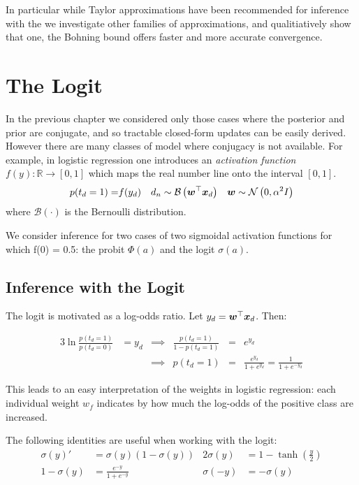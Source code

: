 In particular while Taylor approximations have been recommended for inference with the \cite{Wang2013} we investigate other families of approximations, and qualitiatively show that one, the Bohning bound\cite{Bohning1988} offers faster and more accurate convergence. 
\section{The Logit}
In the previous chapter we considered only those cases where the posterior and prior are conjugate, and so tractable closed-form updates can be easily derived. However there are many classes of model where conjugacy is not available. For example, in logistic regression one introduces an \emph{activation function} $f(y) : \mathbb{R} \rightarrow [0, 1]$ which maps the real number line onto the interval $[0,1]$.
\begin{align*}
p(t_d = 1) = & f(y_d) & d_n  & \sim \mathcal{B} \left( \bm w^\top\bm x_d\right) & \bm w & \sim \mathcal{N} \left( {0}, {\alpha^2 I} \right) \\
\end{align*}
where $\mathcal{B}(\cdot)$ is the Bernoulli distribution.

We consider inference for two cases of two sigmoidal activation functions for which f(0) = 0.5: the probit $\Phi(a)$ and the logit $\sigma(a)$.

\subsection{Inference with the Logit}
The logit is motivated as a log-odds ratio. Let $y_d = \bm w^\top\bm x_d$. Then:

\begin{alignat}{3}
\ln \frac{p(t_d = 1)}{p(t_d = 0)}  & = y_d  &
\implies & \frac{p(t_d = 1)}{1 - p(t_d = 1)}  & = & e^{y_d} \\
& & \implies &  p(t_d = 1)                    & = & \frac{e^{y_d}}{1 + e^{y_d}} = \frac{1}{1+e^{-y_d}}
\end{alignat}

This leads to an easy interpretation of the weights in logistic regression: each individual weight $w_f$ indicates by how much the log-odds of the positive class are increased.

The following identities are useful when working with the logit:
\begin{align}
\sigma(y)' & = \sigma(y)(1 - \sigma(y)) \label{eqn:sigma-identity} &
2 \sigma(y) & = 1 - \tanh (\frac{y}{2}) \\
1 - \sigma(y) & = \frac{e^{-y}}{1 + e^{-y}} &
\sigma(-y) & = -\sigma(y)
\end{align}


